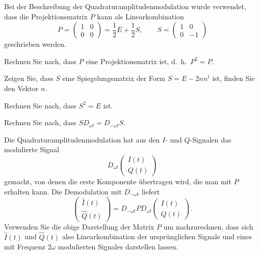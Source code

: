 Bei der Beschreibung der Quadraturamplitudenmodulation wurde
verwendet, dass die Projektionsmatrix $P$ kann als Linearkombination
\[
P
=
\begin{pmatrix}
1&0\\
0&0
\end{pmatrix}
=
\frac12E+\frac12S,
\qquad
S
=
\begin{pmatrix}
1&0\\
0&-1
\end{pmatrix}
\]
geschrieben werden.
\begin{teilaufgaben}
\item
Rechnen Sie nach, dass $P$ eine Projektionsmatrix ist, d.~h.~$P^2=P$.
\item
Zeigen Sie, dass $S$ eine Spiegelungsmatrix der Form $S=E-2nn^t$ ist,
finden Sie den Vektor $n$.
\item
Rechnen Sie nach, dass $S^2=E$ ist.
\item 
Rechnen Sie nach, dass $SD_{\omega t}=D_{-\omega t}S$.
\item
Die Quadraturamplitudenmodulation hat aus den $I$- und $Q$-Signalen
das modulierte Signal 
\[
D_{\omega t}\begin{pmatrix}I(t)\\Q(t)\end{pmatrix}
\]
gemacht, von denen die erste Komponente übertragen wird, die man mit
$P$ erhalten kann. 
Die Demodulation mit $D_{-\omega t}$ liefert
\[
\begin{pmatrix}
\hat{I}(t)\\
\hat{Q}(t)
\end{pmatrix}
=
D_{-\omega t}PD_{\omega t}
\begin{pmatrix}
I(t)\\
Q(t)
\end{pmatrix}.
\]
Verwenden Sie die obige Darstellung der Matrix $P$ um nachzurechnen,
dass sich $\hat{I}(t)$ und $\hat{Q}(t)$ also Linearkombination der
ursprünglichen Signale und eines mit Frequenz $2\omega$ modulierten
Signales darstellen lassen.
\end{teilaufgaben}

